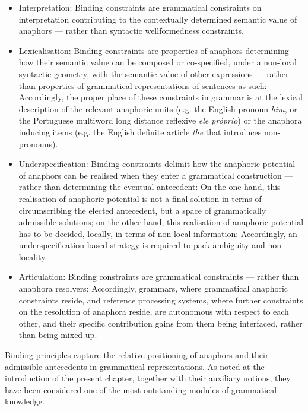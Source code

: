 \documentclass[output=paper
,modfonts
,nonflat]{langsci/langscibook}
\begin{document}
\begin{itemize}

\item Interpretation: Binding constraints are grammatical constraints on interpretation 
contributing to the contextually determined
semantic value of anaphors --- rather than syntactic wellformedness constraints.

\item Lexicalisation: Binding constraints are properties of 
anaphors determining how their semantic value 
can be composed or co-specified, under a non-local syntactic geometry, with the
semantic value of other expressions --- rather than properties of grammatical
representations of sentences as such: Accordingly, the
proper place of these constraints in grammar is at the lexical description of 
the relevant anaphoric units (e.g. the English pronoun \emph{him}, or the Portuguese multiword long distance reflexive \emph{ele pr\'{o}prio}) or the anaphora inducing items (e.g. the English definite article \emph{the} that introduces non-pronouns).

\item Underspecification: Binding constraints delimit how the
anaphoric potential of anaphors can be realised when they
enter a grammatical construction --- rather than determining the eventual antecedent: 
On the one hand, this realisation of anaphoric potential is not a final solution in terms of circumscribing
the elected antecedent, but a space of grammatically admissible solutions;
on the other hand, this realisation of anaphoric potential has to be decided, locally,
in terms of non-local information: Accordingly, an underspecification-based
strategy is required to pack ambiguity and non-locality.

\item Articulation: Binding constraints are grammatical constraints --- rather than 
anaphora resolvers: Accordingly, grammars, where grammatical ana\-phoric
constraints reside, and reference processing systems, where further
constraints on the resolution of anaphora reside,
are autonomous with respect to each other, and their specific contribution gains
from them being interfaced, rather than being mixed up.
\end{itemize}

Binding principles capture the relative positioning of anaphors and their 
admissible antecedents in grammatical representations. As noted at the introduction of the present chapter, together with their auxiliary notions, they have been considered one of the most outstanding modules 
of grammatical knowledge.
\end{document}
